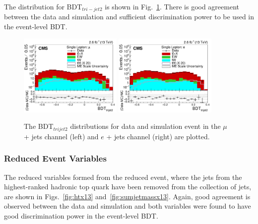 The distribution for BDT$_{tri-jet2}$ is shown in Fig.~\ref{fig:bdtTrijet213}. There is good agreement between the data and simulation and sufficient discrimination power to be used in the event-level BDT.

\begin{figure}[ht!]
    \includegraphics[width=0.44\textwidth]{images/Run2/BDT_trijet2_StackLogY.pdf}
    \includegraphics[width=0.44\textwidth]{images/Run2/BDT_trijet2_StackLogY_e.pdf}
    \caption{ The BDT$_{trijet2}$ distributions for data and simulation event in the $\mu$ + jets channel (left) and $e$ + jets channel (right) are plotted.}
    \label{fig:bdtTrijet213}
\end{figure}

\subsubsection*{Reduced Event Variables}
The reduced variables formed from the reduced event, where the jets from the highest-ranked hadronic top quark have been removed from the collection of jets, are shown in Figs.~\ref{fig:htx13} and~\ref{fig:sumjetmassx13}. Again, good agreement is observed between the data and simulation and both variables were found to have good discrimination power in the event-level BDT.

